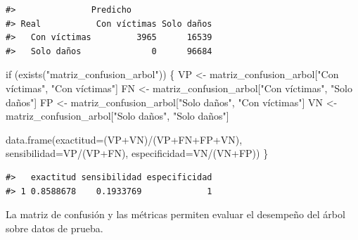 \documentclass[
  spanish,
  10.5pt,
  letterpaper,
  openany,
  headings=big]{scrbook}
\newenvironment{Shaded}{}{}
\newcommand{\AttributeTok}[1]{\textcolor[rgb]{0.84,0.23,0.29}{#1}}
\newcommand{\ControlFlowTok}[1]{\textcolor[rgb]{0.84,0.23,0.29}{#1}}
\newcommand{\FunctionTok}[1]{\textcolor[rgb]{0.44,0.26,0.76}{#1}}
\newcommand{\NormalTok}[1]{\textcolor[rgb]{0.14,0.16,0.18}{#1}}
\newcommand{\OtherTok}[1]{\textcolor[rgb]{0.44,0.26,0.76}{#1}}
\newcommand{\SpecialCharTok}[1]{\textcolor[rgb]{0.00,0.36,0.77}{#1}}
\newcommand{\StringTok}[1]{\textcolor[rgb]{0.01,0.18,0.38}{#1}}
\begin{document}
\begin{verbatim}
#>               Predicho
#> Real           Con víctimas Solo daños
#>   Con víctimas         3965      16539
#>   Solo daños              0      96684
\end{verbatim}

\begin{Shaded}
\begin{Highlighting}[]
\ControlFlowTok{if}\NormalTok{ (}\FunctionTok{exists}\NormalTok{(}\StringTok{"matriz\_confusion\_arbol"}\NormalTok{)) \{}
\NormalTok{  VP }\OtherTok{\textless{}{-}}\NormalTok{ matriz\_confusion\_arbol[}\StringTok{"Con víctimas"}\NormalTok{, }\StringTok{"Con víctimas"}\NormalTok{]}
\NormalTok{  FN }\OtherTok{\textless{}{-}}\NormalTok{ matriz\_confusion\_arbol[}\StringTok{"Con víctimas"}\NormalTok{, }\StringTok{"Solo daños"}\NormalTok{]}
\NormalTok{  FP }\OtherTok{\textless{}{-}}\NormalTok{ matriz\_confusion\_arbol[}\StringTok{"Solo daños"}\NormalTok{, }\StringTok{"Con víctimas"}\NormalTok{]}
\NormalTok{  VN }\OtherTok{\textless{}{-}}\NormalTok{ matriz\_confusion\_arbol[}\StringTok{"Solo daños"}\NormalTok{, }\StringTok{"Solo daños"}\NormalTok{]}

  \FunctionTok{data.frame}\NormalTok{(}\AttributeTok{exactitud=}\NormalTok{(VP}\SpecialCharTok{+}\NormalTok{VN)}\SpecialCharTok{/}\NormalTok{(VP}\SpecialCharTok{+}\NormalTok{FN}\SpecialCharTok{+}\NormalTok{FP}\SpecialCharTok{+}\NormalTok{VN), }\AttributeTok{sensibilidad=}\NormalTok{VP}\SpecialCharTok{/}\NormalTok{(VP}\SpecialCharTok{+}\NormalTok{FN), }\AttributeTok{especificidad=}\NormalTok{VN}\SpecialCharTok{/}\NormalTok{(VN}\SpecialCharTok{+}\NormalTok{FP))}
\NormalTok{\}}
\end{Highlighting}
\end{Shaded}

\begin{verbatim}
#>   exactitud sensibilidad especificidad
#> 1 0.8588678    0.1933769             1
\end{verbatim}

\begin{tcolorbox}[enhanced jigsaw, arc=.35mm, bottomrule=.15mm, bottomtitle=1mm, breakable, colback=white, colbacktitle=quarto-callout-tip-color!10!white, colframe=quarto-callout-tip-color-frame, coltitle=black, left=2mm, leftrule=.75mm, opacityback=0, opacitybacktitle=0.6, rightrule=.15mm, title=\textcolor{quarto-callout-tip-color}{\faLightbulb}\hspace{0.5em}{Interpretación del resultado}, titlerule=0mm, toprule=.15mm, toptitle=1mm]

La matriz de confusión y las métricas permiten evaluar el desempeño del
árbol sobre datos de prueba.

\end{tcolorbox}
\end{document}
